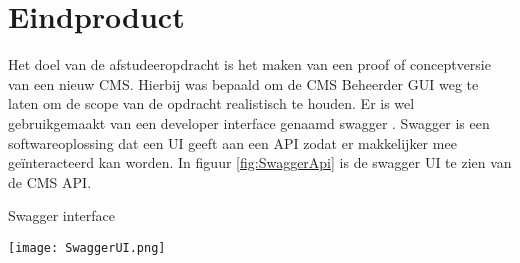 \section{Eindproduct}
\label{section:Eindproduct}
Het doel van de afstudeeropdracht is het maken van een proof of conceptversie van een nieuw CMS.
Hierbij was bepaald om de CMS \gls{Beheerder} \gls{GUI} weg te laten om de scope van de opdracht realistisch te houden.
Er is wel gebruikgemaakt van een developer interface genaamd swagger \parencite{Swagger}.
Swagger is een softwareoplossing dat een UI geeft aan een API zodat er makkelijker mee geïnteracteerd kan worden.
In figuur \ref{fig:SwaggerApi} is de swagger UI te zien van de CMS API.

\whitespace
\begin{graphic}
    \captionsetup{type=figure}
    \caption{Swagger interface}
    \texttt{[image: SwaggerUI.png]}
    \label{fig:SwaggerApi}
\end{graphic}


\newpage


